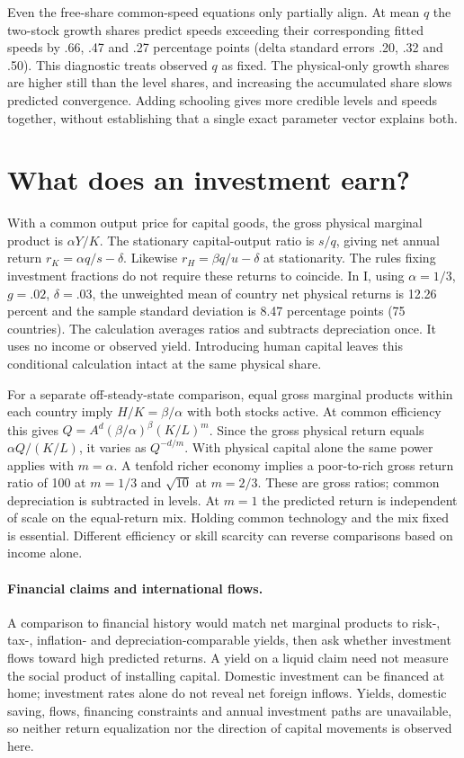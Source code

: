 \documentclass[11pt]{article}
\begin{document}
Even the free-share common-speed equations only partially align. At mean $q$ the two-stock growth shares predict speeds exceeding their corresponding fitted speeds by .66, .47 and .27 percentage points (delta standard errors .20, .32 and .50). This diagnostic treats observed $q$ as fixed. The physical-only growth shares are higher still than the level shares, and increasing the accumulated share slows predicted convergence. Adding schooling gives more credible levels and speeds together, without establishing that a single exact parameter vector explains both.

\section{What does an investment earn?}
With a common output price for capital goods, the gross physical marginal product is $\alpha Y/K$. The stationary capital-output ratio is $s/q$, giving net annual return $r_K=\alpha q/s-\delta$. Likewise $r_H=\beta q/u-\delta$ at stationarity. The rules fixing investment fractions do not require these returns to coincide. In I, using $\alpha=1/3$, $g=.02$, $\delta=.03$, the unweighted mean of country net physical returns is 12.26 percent and the sample standard deviation is 8.47 percentage points (75 countries). The calculation averages ratios and subtracts depreciation once. It uses no income or observed yield. Introducing human capital leaves this conditional calculation intact at the same physical share.

For a separate off-steady-state comparison, equal gross marginal products within each country imply $H/K=\beta/\alpha$ with both stocks active. At common efficiency this gives $Q=A^d(\beta/\alpha)^\beta(K/L)^m$. Since the gross physical return equals $\alpha Q/(K/L)$, it varies as $Q^{-d/m}$. With physical capital alone the same power applies with $m=\alpha$. A tenfold richer economy implies a poor-to-rich gross return ratio of 100 at $m=1/3$ and $\sqrt{10}$ at $m=2/3$. These are gross ratios; common depreciation is subtracted in levels. At $m=1$ the predicted return is independent of scale on the equal-return mix. Holding common technology and the mix fixed is essential. Different efficiency or skill scarcity can reverse comparisons based on income alone.

\paragraph{Financial claims and international flows.}
A comparison to financial history would match net marginal products to risk-, tax-, inflation- and depreciation-comparable yields, then ask whether investment flows toward high predicted returns. A yield on a liquid claim need not measure the social product of installing capital. Domestic investment can be financed at home; investment rates alone do not reveal net foreign inflows. Yields, domestic saving, flows, financing constraints and annual investment paths are unavailable, so neither return equalization nor the direction of capital movements is observed here.
\end{document}
